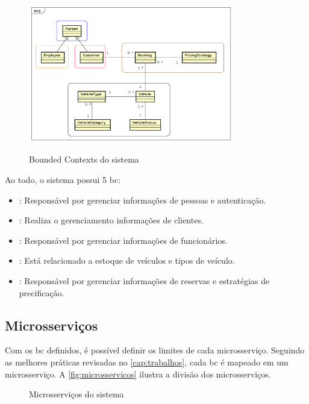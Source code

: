 \begin{figure}[H]
    \centering
    \caption{Bounded Contexts do sistema}
    \includegraphics[width=0.8\textwidth]{media/bounded_contexts.png}
    \label{fig:bounded_contexts}
\end{figure}

Ao todo, o sistema possui 5 \acrfull{bc}:
\begin{itemize}
    \item {}: Responsável por gerenciar informações de pessoas e autenticação.
    \item {}: Realiza o gerenciamento informações de clientes.
    \item {}: Responsável por gerenciar informações de funcionários.
    \item {}: Está relacionado a estoque de veículos e tipos de veículo.
    \item {}: Responsável por gerenciar informações de reservas e estratégias de precificação.
\end{itemize}

\subsection{Microsserviços}
Com os \acrshort{bc} definidos, é possível definir os limites de cada microsserviço. Seguindo as melhores práticas revisadas no \autoref{cap:trabalhos}, cada \acrshort{bc} é mapeado em um microsserviço. A \autoref{fig:microsservicos} ilustra a divisão dos microsserviços.

\begin{figure}[H]
    \centering
    \caption{Microsserviços do sistema}
    \label{fig:microsservicos}
\end{figure}

